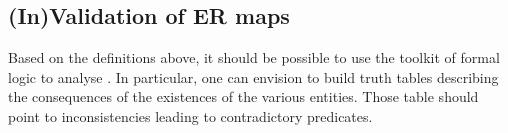 \subsection{(In)Validation of ER maps}

Based on the definitions above, it should be possible to use the toolkit of formal logic to analyse \ERs{}. In particular, one can envision to build truth tables describing the consequences of the existences of the various entities. Those table should point to inconsistencies leading to contradictory predicates.




